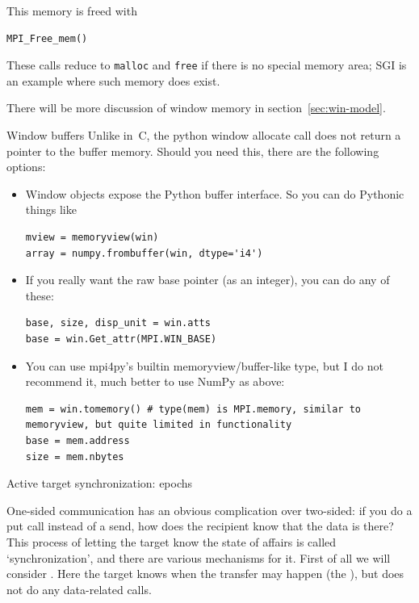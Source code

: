 This memory is freed with
\begin{lstlisting}
MPI_Free_mem()
\end{lstlisting}
These calls reduce to \lstinline{malloc} and \lstinline{free} if there is no special
memory area; SGI is an example where such memory does exist.

There will be more discussion of window memory in section~\ref{sec:win-model}.

\begin{pythonnote}{Window buffers}
  Unlike in~C, the python window allocate call does not return a pointer
  to the buffer memory. Should you need this, there are the following options:
  \begin{itemize}
  \item  Window objects expose the Python buffer interface. So you can do Pythonic things like
\begin{lstlisting}
mview = memoryview(win)
array = numpy.frombuffer(win, dtype='i4')
\end{lstlisting}
\item 
  If you really want the raw base pointer (as an integer), you can do any of these:
\begin{lstlisting}
base, size, disp_unit = win.atts
base = win.Get_attr(MPI.WIN_BASE)
\end{lstlisting}
\item You can use mpi4py's builtin memoryview/buffer-like type, but I
  do not recommend it, much better to use NumPy as above:
\begin{lstlisting}
mem = win.tomemory() # type(mem) is MPI.memory, similar to memoryview, but quite limited in functionality
base = mem.address
size = mem.nbytes
\end{lstlisting}
  \end{itemize}
\end{pythonnote}


 {Active target synchronization: epochs}
\label{sec:fence}

One-sided communication has an obvious complication over two-sided: if
you do a put call instead of a send, how does the recipient know that
the data is there? This process of letting the target know the state
of affairs is called `synchronization', and there are various
mechanisms for it. First of all we will consider . Here the target knows when the transfer
may happen (the ), but does not do
any data-related calls.

